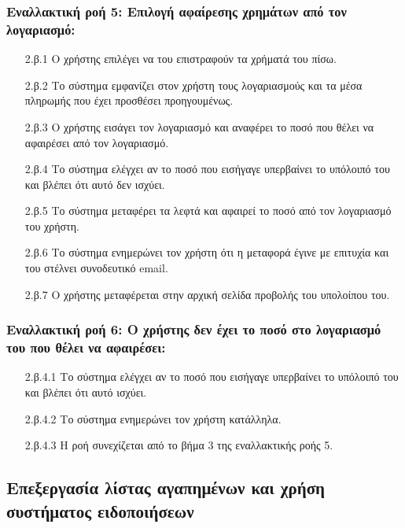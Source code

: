 \documentclass[12pt,a4paper]{article}
\begin{document}
\subsubsection*{Εναλλακτική ροή 5: Επιλογή αφαίρεσης χρημάτων από τον λογαριασμό:}
\begin{enumerate}
    \item [2.β.1] Ο χρήστης επιλέγει να του επιστραφούν τα χρήματά του πίσω.
    \item [2.β.2] Το σύστημα εμφανίζει στον χρήστη τους λογαριασμούς και τα μέσα πληρωμής που έχει προσθέσει προηγουμένως.
    \item [2.β.3] Ο χρήστης εισάγει τον λογαριασμό και αναφέρει το ποσό που θέλει να αφαιρέσει από τον λογαριασμό.
    \item [2.β.4] Το σύστημα ελέγχει αν το ποσό που εισήγαγε υπερβαίνει το υπόλοιπό του και βλέπει ότι αυτό δεν ισχύει. 
    \item [2.β.5] Το σύστημα μεταφέρει τα λεφτά και αφαιρεί το ποσό από τον λογαριασμό του χρήστη.
    \item [2.β.6] Το σύστημα ενημερώνει τον χρήστη ότι η μεταφορά έγινε με επιτυχία και του στέλνει συνοδευτικό email.
    \item [2.β.7] Ο χρήστης μεταφέρεται στην αρχική σελίδα προβολής του υπολοίπου του.
\end{enumerate}

\subsubsection*{Εναλλακτική ροή 6: Ο χρήστης δεν έχει το ποσό στο λογαριασμό του που θέλει να αφαιρέσει:}
\begin{enumerate}
    \item [2.β.4.1] Το σύστημα ελέγχει αν το ποσό που εισήγαγε υπερβαίνει το υπόλοιπό του και βλέπει ότι αυτό ισχύει. 
    \item [2.β.4.2] Το σύστημα ενημερώνει τον χρήστη κατάλληλα.
    \item [2.β.4.3] Η ροή συνεχίζεται από το βήμα 3 της εναλλακτικής ροής 5.
\end{enumerate}

\subsection{Επεξεργασία λίστας αγαπημένων και χρήση συστήματος ειδοποιήσεων}
\end{document}
